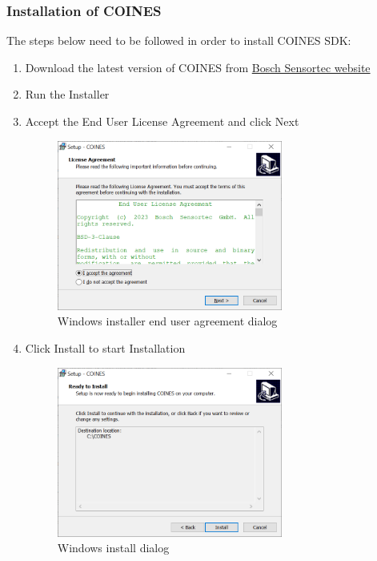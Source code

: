 \documentclass{article}
\begin{document}
\subsubsection{Installation of COINES}
The steps below need to be followed in order to install COINES SDK:
\begin{enumerate}
	\item Download the latest version of COINES from \href{https://www.bosch-sensortec.com/software-tools/tools/coines/}{Bosch Sensortec website}
	\item Run the Installer
	\item Accept the End User License Agreement and click Next
	\begin{figure}[H]
		\begin{center}
			\includegraphics[width=0.7\textwidth]{coinesAPI_images/Windows_installation_user_agreement.png}
			\caption{Windows installer end user agreement dialog}
		\end{center}
	\end{figure}
	\item Click Install to start Installation
	\begin{figure}[H]
		\begin{center}
			\includegraphics[width=0.7\textwidth]{coinesAPI_images/Windows_install_dialog.png}
			\caption{Windows install dialog}
		\end{center}
	\end{figure}
\end{enumerate}
\end{document}
